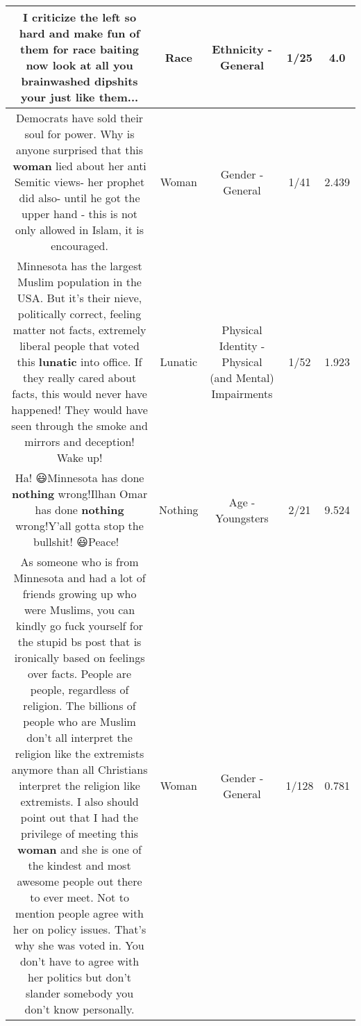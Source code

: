 \documentclass[11pt]{article}
\newlength\mylength
\begin{document}
\begin{center}
\begin{longtable}{|C{.65\mylength}|C{.30\mylength}|C{.12\mylength}|C{.12\mylength}|C{.12\mylength}|}
  \small I criticize the left so hard and make fun of them for \textbf{race} baiting now look at all you brainwashed dipshits your just like them...\normalsize   & Race & Ethnicity - General & 1/25 & 4.0 \\  \hline
  \small Democrats have sold their soul for power. Why is anyone surprised that this \textbf{woman} lied about her anti Semitic views- her prophet did also- until he got the upper hand - this is not only allowed in Islam, it is encouraged.\normalsize   & Woman & Gender - General & 1/41 & 2.439 \\  \hline
  \small Minnesota has the largest Muslim population in the USA. But it's their nieve, politically correct, feeling matter not facts, extremely liberal people that voted this \textbf{lunatic} into office. If they really cared about facts, this would never have happened! They would have seen through the smoke and mirrors and deception! Wake up!\normalsize   & Lunatic & Physical Identity - Physical (and Mental) Impairments & 1/52 & 1.923 \\  \hline
  \small Ha!   😃Minnesota has done \textbf{nothing} wrong!Ilhan Omar has done \textbf{nothing} wrong!Y'all gotta stop the bullshit!   😃Peace!  🙂\normalsize   & Nothing & Age - Youngsters & 2/21 & 9.524 \\  \hline
  \small As someone who is from Minnesota and had a lot of friends growing up who were Muslims, you can kindly go fuck yourself for the stupid bs post that is ironically based on feelings over facts.  People are people, regardless of religion.  The billions of people who are Muslim don't all interpret the religion like the extremists anymore than all Christians interpret the religion like extremists.  I also should point out that I had the privilege of meeting this \textbf{woman} and she is one of the kindest and most awesome people out there to ever meet.  Not  to mention people agree with her on policy issues.  That's why she was voted in.  You don't have to agree with her politics but don't slander somebody you don't know personally.\normalsize   & Woman & Gender - General & 1/128 & 0.781 \\  \hline

\end{longtable}
\end{center}
\end{document}

